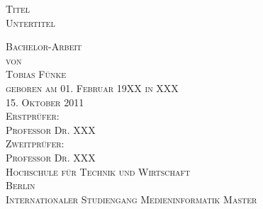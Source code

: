 \thispagestyle{empty}


\begin{center}

\vspace*{2cm}
\Large
\textsc{Titel}\\
\textsc{Untertitel}

\vspace{3cm}

\textsc{Bachelor-Arbeit\\[0.5\baselineskip]
von\\[0.5\baselineskip]
Tobias Fünke\\
{\normalsize \textsc{geboren am 01. Februar 19XX in XXX}}}\\

\vspace{3cm}
\textsc{15. Oktober 2011}\\ %

\vspace{1cm}
\textsc{Erstprüfer:\\
Professor Dr. XXX}\\
\textsc{Zweitprüfer:\\
Professor Dr. XXX}\\

\vspace{1cm}
\textsc{Hochschule für Technik und Wirtschaft\\
Berlin\\
Internationaler Studiengang Medieninformatik Master}

\end{center}

\addtocounter{page}{-1}
